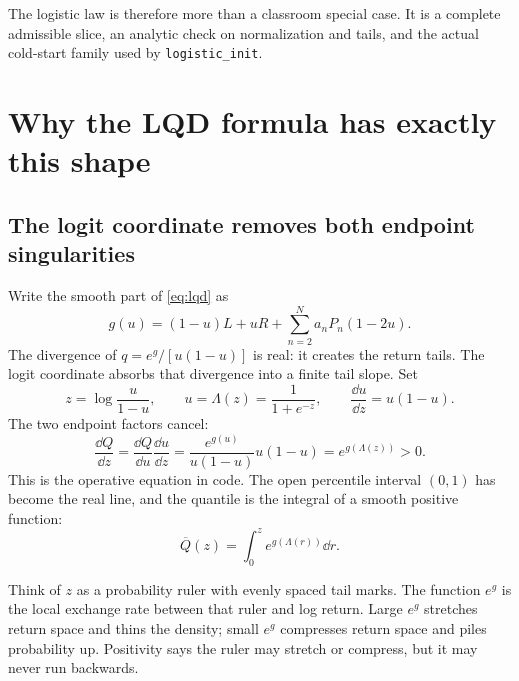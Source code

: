 \documentclass[11pt]{article}
\begin{document}
The logistic law is therefore more than a classroom special case.  It is a
complete admissible slice, an analytic check on normalization and tails, and
the actual cold-start family used by \texttt{logistic\_init}.

\section{Why the LQD formula has exactly this shape}
\label{sec:shape}

\subsection{The logit coordinate removes both endpoint singularities}

Write the smooth part of \eqref{eq:lqd} as
\begin{equation}
g(u)=(1-u)L+uR+\sum_{n=2}^{N}a_nP_n(1-2u).
\label{eq:g}
\end{equation}
The divergence of $q=e^g/[u(1-u)]$ is real: it creates the return tails.
The logit coordinate absorbs that divergence into a finite tail slope.  Set
\begin{equation}
z=\log\frac{u}{1-u},\qquad
u=\Lambda(z)=\frac{1}{1+e^{-z}},\qquad
\frac{\dd u}{\dd z}=u(1-u).
\label{eq:logit}
\end{equation}
The two endpoint factors cancel:
\begin{equation}
\frac{\dd Q}{\dd z}
=\frac{\dd Q}{\dd u}\frac{\dd u}{\dd z}
=\frac{e^{g(u)}}{u(1-u)}u(1-u)
=e^{g(\Lambda(z))}>0.
\label{eq:qz}
\end{equation}
This is the operative equation in code.  The open percentile interval
$(0,1)$ has become the real line, and the quantile is the integral of a smooth
positive function:
\begin{equation}
\overline Q(z)=\int_0^z e^{g(\Lambda(r))}\dd r.
\label{eq:qbar}
\end{equation}

\begin{heuristic}
Think of $z$ as a probability ruler with evenly spaced tail marks.  The function
$e^g$ is the local exchange rate between that ruler and log return.  Large
$e^g$ stretches return space and thins the density; small $e^g$ compresses
return space and piles probability up.  Positivity says the ruler may stretch
or compress, but it may never run backwards.
\end{heuristic}
\end{document}
